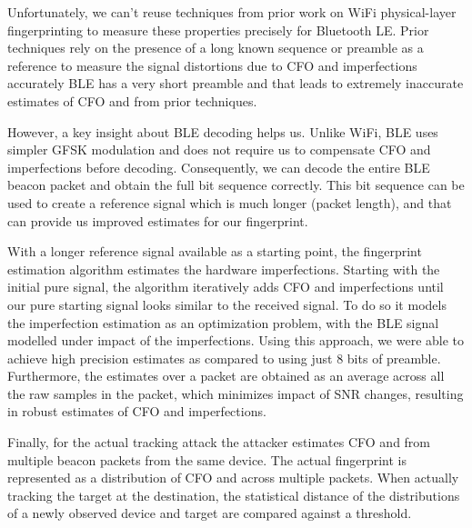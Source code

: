 Unfortunately, we can't reuse techniques from prior work on WiFi physical-layer fingerprinting to measure these properties precisely for Bluetooth LE. 
%
Prior techniques rely on the presence of a long known sequence or preamble as a reference to measure the signal distortions due to CFO and \iq imperfections accurately
%
BLE has a very short preamble and that leads to extremely inaccurate estimates of CFO and \iq from prior techniques.
%

However, a key insight about BLE decoding helps us.
%
Unlike WiFi, BLE uses simpler GFSK modulation and does not require us to compensate CFO and \iq imperfections before decoding.
%
Consequently, we can decode the entire BLE beacon packet and obtain the full bit sequence correctly.
%
This bit sequence can be used to create a reference signal which is much longer (packet length), and that can provide us improved estimates for our fingerprint.

With a longer reference signal available as a starting point, the fingerprint estimation algorithm estimates the hardware imperfections. 
%
Starting with the initial pure signal, the algorithm iteratively adds CFO and \iq imperfections until our pure starting signal looks similar to the received signal.
%
To do so it models the imperfection estimation as an optimization problem, with the BLE signal modelled under impact of the imperfections.
%
Using this approach, we were able to achieve high precision estimates as compared to using just 8 bits of preamble.
%
Furthermore, the estimates over a packet are obtained as an average across all the raw samples in the packet, which minimizes impact of SNR changes, resulting in robust estimates of CFO and \iq imperfections.

Finally, for the actual tracking attack the attacker estimates CFO and \iq from multiple beacon packets from the same device.
%
The actual fingerprint is represented as a distribution of CFO and \iq across multiple packets.
%
When actually tracking the target at the destination, the statistical distance of the distributions of a newly observed device and target are compared against a threshold.
